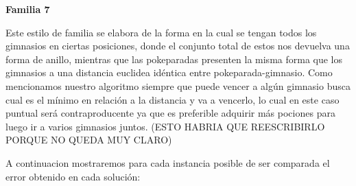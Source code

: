 \begin{center}
\textbf{Familia 7}
\end{center}

Este estilo de familia se elabora de la forma en la cual se tengan todos los gimnasios en ciertas posiciones, donde el conjunto total de estos nos devuelva una forma de anillo, mientras que las pokeparadas presenten la misma forma que los gimnasios a una distancia euclidea id\'entica entre pokeparada-gimnasio. Como mencionamos nuestro algoritmo siempre que puede vencer a alg\'un gimnasio busca cual es el m\'inimo en relaci\'on a la distancia y va a vencerlo, lo cual en este caso puntual ser\'a contraproducente ya que es preferible adquirir m\'as pociones para luego ir a varios gimnasios juntos. (ESTO HABRIA QUE REESCRIBIRLO PORQUE NO QUEDA MUY CLARO)

\begin{figure} [!ht]
 \centering
       \label{fig:jaggies}
    \label{fig:moire}
    \end{figure}

A continuacion mostraremos para cada instancia posible de ser comparada el error obtenido en cada soluci\'on:

